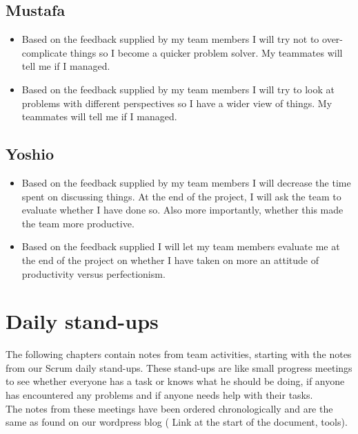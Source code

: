 \documentclass[12pt]{article}
\begin{document}
	\subsection{Mustafa}
	\begin{itemize}
		\item Based on the feedback supplied by my team members I will try not to over-complicate things so I become a quicker problem solver. My teammates will tell me if I managed.
		\item Based on the feedback supplied by my team members I will try to look at problems with different perspectives so I have a wider view of things. My teammates will tell me if I managed.
	\end{itemize}
	\subsection{Yoshio}
	\begin{itemize}
		\item Based on the feedback supplied by my team members I will decrease the time spent on discussing things. At the end of the project, I will ask the team to evaluate whether I have done so. Also more importantly, whether this made the team more productive.
		\item Based on the feedback supplied I will let my team members evaluate me at the end of the project on whether I have taken on more an attitude of productivity versus perfectionism.
	\end{itemize}
	\newpage
	\section{Daily stand-ups}
	The following chapters contain notes from team activities, starting with the notes from our Scrum daily stand-ups. These stand-ups are like small progress meetings to see whether everyone has a task or knows what he should be doing, if anyone has encountered any problems and if anyone needs help with their tasks.\\
	The notes from these meetings have been ordered chronologically and are the same as found on our wordpress blog ( Link at the start of the document, tools).
\end{document}

